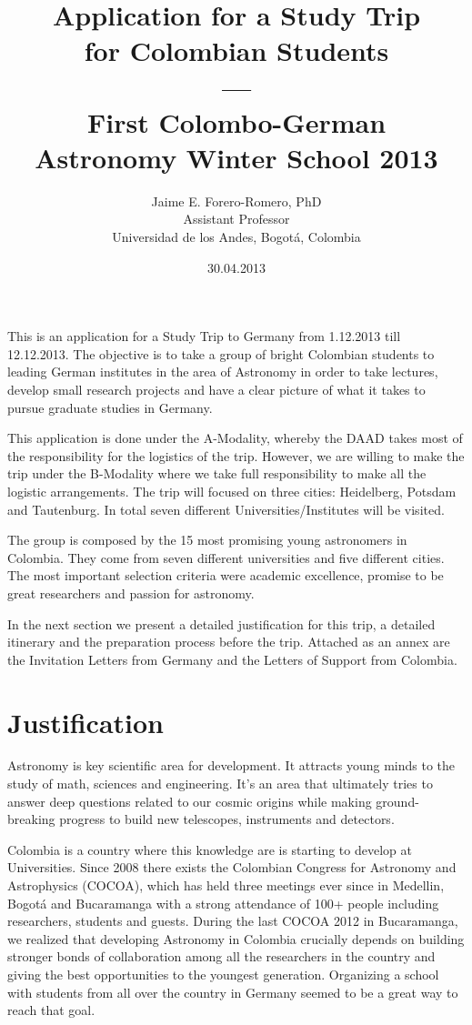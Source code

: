 \documentclass[12pt]{article}
\title{Application for a Study Trip \\ for Colombian
  Students\\---\\ First Colombo-German \\ Astronomy Winter School 2013}
\author{Jaime E. Forero-Romero, PhD \\ {\small Assistant Professor}
  \\ {\small Universidad de los Andes, Bogot\'a, Colombia}}
\date{30.04.2013}
\begin{document}
\maketitle
This is an application for a Study Trip to Germany from 1.12.2013 till
12.12.2013. The objective is to take a group of bright Colombian students to
leading German institutes in the area of Astronomy in order to take lectures,
develop small research projects and have a clear picture of what it
takes to pursue graduate studies in Germany. 

This application is done under the A-Modality, whereby the DAAD takes
most of the responsibility for the logistics of the trip. However, we
are willing to make the trip under the B-Modality where we take full
responsibility to make all the logistic arrangements. The trip will
focused on three cities: Heidelberg, Potsdam and Tautenburg. In total
seven different Universities/Institutes will be visited.

The group is composed by the 15 most promising young astronomers in
Colombia. They come from seven different universities and five different
cities. The most important selection criteria were academic excellence,
promise to be great researchers and passion for astronomy.

In the next section we present a detailed justification for this trip,
a detailed itinerary and the preparation process before the
trip. Attached as an annex are the Invitation Letters from Germany and
the Letters of Support from Colombia.

\newpage

\section{Justification}

Astronomy is key scientific area for development. It attracts young
minds to the study of math, sciences and engineering. It's an area
that ultimately tries to answer deep questions related to our
cosmic origins while making ground-breaking progress to build new
telescopes, instruments and detectors.

Colombia is a country where this knowledge are is starting to develop
at Universities. Since 2008 there exists the Colombian Congress for
Astronomy and Astrophysics (COCOA), which has held three meetings ever
since in Medellin, Bogot\'a and Bucaramanga with a strong attendance
of 100+ people including researchers, students and guests. During the
last COCOA 2012 in Bucaramanga, we realized that developing Astronomy
in Colombia crucially depends on building stronger bonds of
collaboration among all the researchers in the country and giving the
best opportunities to the youngest generation. Organizing a school
with students from all over the country in Germany seemed to be a
great way to reach that goal. 
\end{document}
